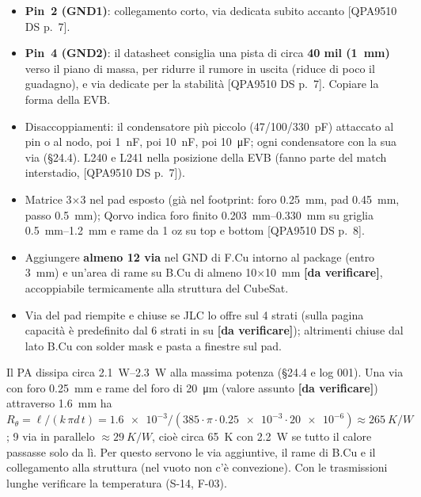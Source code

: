 \documentclass[a4paper,10pt]{article}
\newcommand{\dv}{\textcolor{verfr}{\textbf{[da verificare]}}}
\newcommand{\fonte}[1]{{\footnotesize\color{sbgray}[#1]}}
\newcounter{regola}
\begin{document}
\begin{regola}
\begin{itemize}
\item \textbf{Pin~2 (GND1)}: collegamento corto, via dedicata subito accanto
      \fonte{QPA9510 DS p.~7}.
\item \textbf{Pin~4 (GND2)}: il datasheet consiglia una pista di circa \textbf{40 mil (\SI{1}{mm})} verso il
      piano di massa, per ridurre il rumore in uscita (riduce di poco il guadagno), e via dedicate per la
      stabilità \fonte{QPA9510 DS p.~7}. Copiare la forma della EVB.
\item Disaccoppiamenti: il condensatore più piccolo (\SI{47}{}/\SI{100}{}/\SI{330}{pF}) attaccato al pin o
      al nodo, poi \SI{1}{nF}, poi \SI{10}{nF}, poi \SI{10}{\micro F}; ogni condensatore con la sua via
      (\S24.4). L240 e L241 nella posizione della EVB (fanno parte del match interstadio,
      \fonte{QPA9510 DS p.~7}).
\end{itemize}
\end{regola}

\begin{regola}
\begin{itemize}
\item Matrice 3$\times$3 nel pad esposto (già nel footprint: foro \SI{0.25}{mm}, pad \SI{0.45}{mm}, passo
      \SI{0.5}{mm}); Qorvo indica foro finito \SIrange{0.203}{0.330}{mm} su griglia \SIrange{0.5}{1.2}{mm} e
      rame da 1 oz su top e bottom \fonte{QPA9510 DS p.~8}.
\item Aggiungere \textbf{almeno 12 via} nel GND di F.Cu intorno al package (entro \SI{3}{mm}) e un'area di
      rame su B.Cu di almeno \SI{10}{}$\times$\SI{10}{mm} \dv, accoppiabile termicamente alla struttura
      del CubeSat.
\item Via del pad riempite e chiuse se JLC lo offre sul 4 strati (sulla pagina capacità è predefinito
      dal 6 strati in su \dv); altrimenti chiuse dal lato B.Cu con solder mask e pasta a finestre sul pad.
\end{itemize}
\end{regola}

\begin{perche}
Il PA dissipa circa \SIrange{2.1}{2.3}{W} alla massima potenza (\S24.4 e log 001). Una via con foro
\SI{0.25}{mm} e rame del foro di \SI{20}{\micro m} (valore assunto \dv) attraverso \SI{1.6}{mm} ha
$R_\theta=\ell/(k\,\pi d\,t)=\num{1.6e-3}/(385\cdot\pi\cdot\num{0.25e-3}\cdot\num{20e-6})\approx\SI{265}{K/W}$;
9 via in parallelo $\approx\SI{29}{K/W}$, cioè circa \SI{65}{K} con \SI{2.2}{W} se tutto il calore passasse
solo da lì. Per questo servono le via aggiuntive, il rame di B.Cu e il collegamento alla struttura (nel
vuoto non c'è convezione). Con le trasmissioni lunghe verificare la temperatura (S-14, F-03).
\end{perche}
\end{document}
